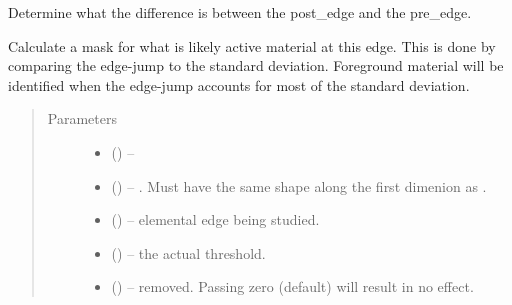 \documentclass[letterpaper,10pt,english]{sphinxmanual}
\begin{document}

\begin{fulllineitems}
\label{\detokenize{xanespy:xanespy.xanes_math.k_edge_jump}}
Determine what the difference is between the post\_edge and the
pre\_edge.

\end{fulllineitems}


\begin{fulllineitems}
\label{\detokenize{xanespy:xanespy.xanes_math.k_edge_mask}}
Calculate a mask for what is likely active material at this
edge. This is done by comparing the edge-jump to the standard
deviation. Foreground material will be identified when the
edge-jump accounts for most of the standard deviation.
\begin{quote}\begin{description}
\item[{Parameters}] \leavevmode\begin{itemize}
\item {} 
 (\sphinxstyleliteralemphasis{-}) -- 

\item {} 
 (\sphinxstyleliteralemphasis{-}) -- . Must have the same shape along the first dimenion as
.

\item {} 
 (\sphinxstyleliteralemphasis{-}) -- elemental edge being studied.

\item {} 
 (\sphinxstyleliteralemphasis{-}) -- the actual threshold.

\item {} 
 (\sphinxstyleliteralemphasis{-}) -- removed. Passing zero (default) will result in no effect.

\end{itemize}


\end{description}
\end{quote}
\end{fulllineitems}
\end{document}
